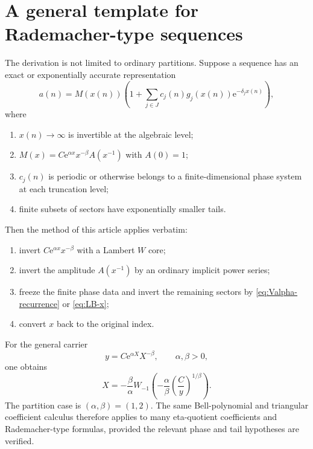 \documentclass[11pt,a4paper]{article}
\numberwithin{equation}{section}
\theoremstyle{remark}
\newcommand{\e}{\mathrm e}
\begin{document}
\section{A general template for Rademacher-type sequences}\label{sec:generalization}

The derivation is not limited to ordinary partitions.  Suppose a sequence has an exact or exponentially accurate representation
\begin{equation}\label{eq:general-rademacher-type}
 a(n)=M(x(n))
 \left(1+\sum_{j\in J}c_j(n)g_j(x(n))\e^{-\delta_jx(n)}\right),
\end{equation}
where
\begin{enumerate}
\item $x(n)\to\infty$ is invertible at the algebraic level;
\item $M(x)=C\e^{\alpha x}x^{-\beta}A(x^{-1})$ with $A(0)=1$;
\item $c_j(n)$ is periodic or otherwise belongs to a finite-dimensional phase system at each truncation level;
\item finite subsets of sectors have exponentially smaller tails.
\end{enumerate}
Then the method of this article applies verbatim:
\begin{enumerate}
\item invert $C\e^{\alpha x}x^{-\beta}$ with a Lambert $W$ core;
\item invert the amplitude $A(x^{-1})$ by an ordinary implicit power series;
\item freeze the finite phase data and invert the remaining sectors by \cref{eq:Valpha-recurrence} or \cref{eq:LB-x};
\item convert $x$ back to the original index.
\end{enumerate}

For the general carrier
\begin{equation}
 y=C\e^{\alpha X}X^{-\beta},\qquad \alpha,\beta>0,
\end{equation}
one obtains
\begin{equation}\label{eq:general-carrier-W}
 X=-\frac{\beta}{\alpha}
 W_{-1}\!\left(
 -\frac{\alpha}{\beta}
 \left(\frac{C}{y}\right)^{1/\beta}
 \right).
\end{equation}
The partition case is $(\alpha,\beta)=(1,2)$.  The same Bell-polynomial and triangular coefficient calculus therefore applies to many eta-quotient coefficients and Rademacher-type formulas, provided the relevant phase and tail hypotheses are verified.
\end{document}
